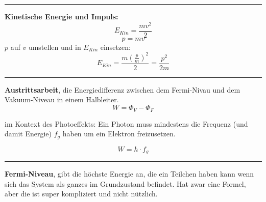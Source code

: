 \documentclass{article}
\begin{document}
\vspace{0.5cm}
\hrule
\vspace{0.5cm}
\textbf{Kinetische Energie und Impuls:}
\begin{equation}
   E_{Kin} = \frac{mv^2}{2} 
\end{equation}
\begin{equation}
    p = mv
\end{equation}
$p$ auf $v$ umstellen und in $E_{Kin}$ einsetzen:
\begin{equation}
   E_{Kin} = \frac{m(\frac{p}{m})^2}{2} = \frac{p^2}{2m}
\end{equation}
\hrule
\vspace{0.5cm}
\textbf{Austrittsarbeit}, die Energiedifferenz zwischen dem Fermi-Nivau und dem Vakuum-Niveau in einem Halbleiter.
\begin{equation}
W = \Phi_V - \Phi_F
\end{equation}

im Kontext des Photoeffekts: Ein Photon muss mindestens die Frequenz (und damit Energie) $f_g$ haben um ein Elektron freizusetzen. 

\begin{equation}
W = h \cdot f_g    
\end{equation}

\hrule
\vspace{0.5cm}
\textbf{Fermi-Niveau}, gibt die höchste Energie an, die ein Teilchen haben kann wenn sich das System als ganzes im Grundzustand befindet.
Hat zwar eine Formel, aber die ist super kompliziert und nicht nützlich. 
\end{document}
